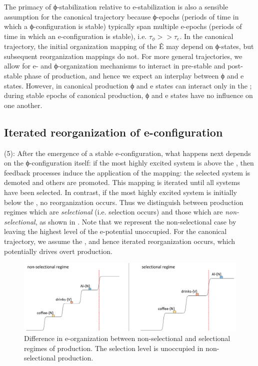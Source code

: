   The primacy of ϕ-stabilization relative to e-stabilization is also a sensible assumption for the canonical trajectory because ϕ-epochs (periods of time in which a ϕ-configuration is stable) typically span multiple e-epochs (periods of time in which an e-configuration is stable), i.e. $\tau_{\phi} >> \tau_e$. In the canonical trajectory, the initial organization mapping of the  Ê may depend on ϕ-states, but subsequent reorganization mappings do not. For more general trajectories, we allow for e- and ϕ-organization mechanisms to interact in pre-stable and post-stable phase of production, and hence we expect an interplay between ϕ and e states. However, in canonical production ϕ and e states can interact only in the ; during stable epochs of canonical production, ϕ and e states have no influence on one another. 

\subsection{Iterated reorganization of e-configuration}

(5): After the emergence of a stable e-configuration, what happens next depends on the ϕ-configuration itself: if the most highly excited system is above the , then feedback processes induce the application of the  mapping: the selected system is demoted and others are promoted. This mapping is iterated until all systems have been selected. In contrast, if the most highly excited system is initially below the , no reorganization occurs. Thus we distinguish between production regimes which are \textit{selectional} (i.e. selection occurs) and those which are \textit{non-selectional}, as shown in {}. Note that we represent the non-selectional case by leaving the highest level of the e-potential unoccupied. For the canonical trajectory, we assume the , and hence iterated reorganization occurs, which potentially drives overt production. 

  
\begin{figure}
\includegraphics[width=\textwidth]{figures/Tilsen-img53.png}
\caption{Difference in e-organization between non-selectional and selectional regimes of production. The selection level is unoccupied in non-selectional production.}
\label{fig:4:3}
\end{figure}
 

